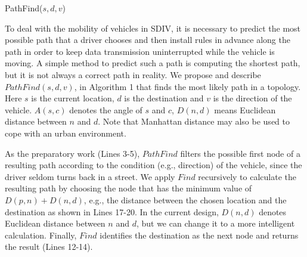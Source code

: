 \documentclass[journal]{IEEEtran}
\begin{document}
\begin{algorithm}[t]
\caption{PathFind($s,d,v$)}
\label{Algorithm 2}
\begin{algorithmic}[1]

\end{algorithmic}
\vspace{-0.06in}
\end{algorithm}




To deal with the mobility of vehicles in SDIV, it is necessary to predict the most possible path that a driver chooses and then install rules in advance along the path in order to keep data transmission uninterrupted while the vehicle is moving. A simple method to predict such a path is computing the shortest path, but it is not always a correct path in reality. We propose and describe $PathFind(s,d,v)$, in Algorithm 1 that finds the most likely path in a topology. Here $s$ is the current location, $d$ is the destination and $v$ is the direction of the vehicle. $A(s,c)$ denotes the angle of $s$ and $c$, $D(n,d)$ means Euclidean distance between $n$ and $d$. Note that Manhattan distance may also be used to cope with an urban environment.

As the preparatory work (Lines 3-5), $PathFind$ filters the possible first node of a resulting path according to the condition (e.g., direction) of the vehicle, since the driver seldom turns back in a street. We apply $Find$ recursively to calculate the resulting path by choosing the node that has the minimum value of $D(p,n)+D(n,d)$, e.g., the distance between the chosen location and the destination as shown in Lines 17-20. In the current design, $D(n,d)$ denotes Euclidean distance between $n$ and $d$, but we can change it to a more intelligent calculation. Finally, $Find$ identifies the destination as the next node and returns the result (Lines 12-14).
\end{document}
